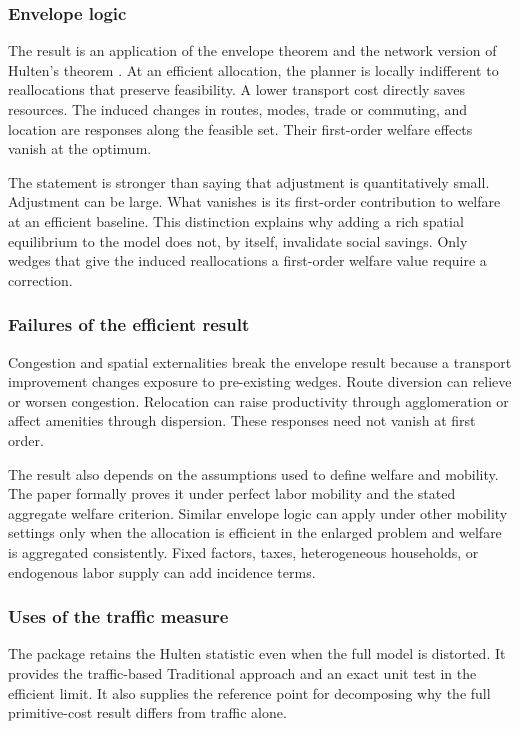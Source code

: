 \subsubsection{Envelope logic}

The result is an application of the envelope theorem and the network version
of Hulten's theorem \citep{hulten1978growth,baqaee2019macroeconomic}. At an
efficient allocation, the planner is locally indifferent to reallocations
that preserve feasibility. A lower transport cost directly saves resources.
The induced changes in routes, modes, trade or commuting, and location are
responses along the feasible set. Their first-order welfare effects vanish at
the optimum.

The statement is stronger than saying that adjustment is quantitatively
small. Adjustment can be large. What vanishes is its first-order contribution
to welfare at an efficient baseline. This distinction explains why adding a
rich spatial equilibrium to the model does not, by itself, invalidate social
savings. Only wedges that give the induced reallocations a first-order welfare
value require a correction.

\subsubsection{Failures of the efficient result}

Congestion and spatial externalities break the envelope result because a
transport improvement changes exposure to pre-existing wedges. Route diversion
can relieve or worsen congestion.
Relocation can raise productivity through agglomeration or affect amenities
through dispersion. These responses need not vanish at first order.

The result also depends on the assumptions used to define welfare and mobility. The paper
formally proves it under perfect labor mobility and the stated aggregate
welfare criterion. Similar envelope logic can apply under other mobility
settings only when the allocation is efficient in the enlarged problem and
welfare is aggregated consistently. Fixed factors, taxes, heterogeneous
households, or endogenous labor supply can add incidence terms.

\subsubsection{Uses of the traffic measure}

The package retains the Hulten statistic even when the full model is
distorted. It provides the traffic-based Traditional approach and an exact unit
test in the efficient limit. It also supplies the reference point for
decomposing why the full primitive-cost result differs from traffic alone.


